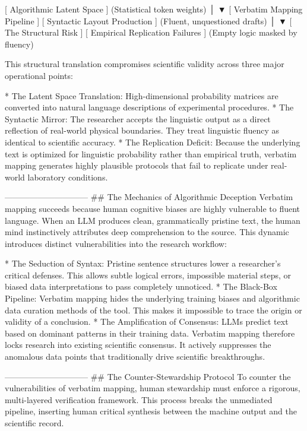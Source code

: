        [ Algorithmic Latent Space ]
         (Statistical token weights)
                     │
                     ▼  [ Verbatim Mapping Pipeline ]
       [ Syntactic Layout Production ]
         (Fluent, unquestioned drafts)
                     │
                     ▼  [ The Structural Risk ]
       [ Empirical Replication Failures ]
         (Empty logic masked by fluency)

This structural translation compromises scientific validity across three major operational points:

* The Latent Space Translation: High-dimensional probability matrices are converted into natural language descriptions of experimental procedures.
* The Syntactic Mirror: The researcher accepts the linguistic output as a direct reflection of real-world physical boundaries. They treat linguistic fluency as identical to scientific accuracy.
* The Replication Deficit: Because the underlying text is optimized for linguistic probability rather than empirical truth, verbatim mapping generates highly plausible protocols that fail to replicate under real-world laboratory conditions.

------------------------------
## The Mechanics of Algorithmic Deception
Verbatim mapping succeeds because human cognitive biases are highly vulnerable to fluent language. When an LLM produces clean, grammatically pristine text, the human mind instinctively attributes deep comprehension to the source. This dynamic introduces distinct vulnerabilities into the research workflow:

* The Seduction of Syntax: Pristine sentence structures lower a researcher's critical defenses. This allows subtle logical errors, impossible material steps, or biased data interpretations to pass completely unnoticed.
* The Black-Box Pipeline: Verbatim mapping hides the underlying training biases and algorithmic data curation methods of the tool. This makes it impossible to trace the origin or validity of a conclusion.
* The Amplification of Consensus: LLMs predict text based on dominant patterns in their training data. Verbatim mapping therefore locks research into existing scientific consensus. It actively suppresses the anomalous data points that traditionally drive scientific breakthroughs.

------------------------------
## The Counter-Stewardship Protocol
To counter the vulnerabilities of verbatim mapping, human stewardship must enforce a rigorous, multi-layered verification framework. This process breaks the unmediated pipeline, inserting human critical synthesis between the machine output and the scientific record.

